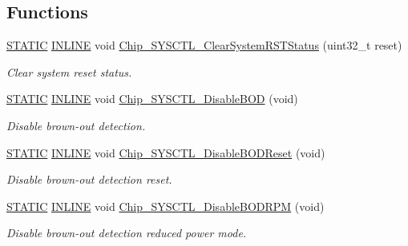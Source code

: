 \subsection*{Functions}
\begin{DoxyCompactItemize}
\item 
\hyperlink{group__LPC__Types__Public__Macros_ga10b2d890d871e1489bb02b7e70d9bdfb}{S\+T\+A\+T\+IC} \hyperlink{group__LPC__Types__Public__Types_ga2eb6f9e0395b47b8d5e3eeae4fe0c116}{I\+N\+L\+I\+NE} void \hyperlink{group__SYSCTL__17XX__40XX_ga565050aac84c3cfa86874d42630d7eb8}{Chip\+\_\+\+S\+Y\+S\+C\+T\+L\+\_\+\+Clear\+System\+R\+S\+T\+Status} (uint32\+\_\+t reset)
\begin{DoxyCompactList}\small\item\em Clear system reset status. \end{DoxyCompactList}\item 
\hyperlink{group__LPC__Types__Public__Macros_ga10b2d890d871e1489bb02b7e70d9bdfb}{S\+T\+A\+T\+IC} \hyperlink{group__LPC__Types__Public__Types_ga2eb6f9e0395b47b8d5e3eeae4fe0c116}{I\+N\+L\+I\+NE} void \hyperlink{group__SYSCTL__17XX__40XX_ga20468997a597d6fcae205472c22a949c}{Chip\+\_\+\+S\+Y\+S\+C\+T\+L\+\_\+\+Disable\+B\+OD} (void)
\begin{DoxyCompactList}\small\item\em Disable brown-\/out detection. \end{DoxyCompactList}\item 
\hyperlink{group__LPC__Types__Public__Macros_ga10b2d890d871e1489bb02b7e70d9bdfb}{S\+T\+A\+T\+IC} \hyperlink{group__LPC__Types__Public__Types_ga2eb6f9e0395b47b8d5e3eeae4fe0c116}{I\+N\+L\+I\+NE} void \hyperlink{group__SYSCTL__17XX__40XX_gaee6f6a45b42962728419d15328427564}{Chip\+\_\+\+S\+Y\+S\+C\+T\+L\+\_\+\+Disable\+B\+O\+D\+Reset} (void)
\begin{DoxyCompactList}\small\item\em Disable brown-\/out detection reset. \end{DoxyCompactList}\item 
\hyperlink{group__LPC__Types__Public__Macros_ga10b2d890d871e1489bb02b7e70d9bdfb}{S\+T\+A\+T\+IC} \hyperlink{group__LPC__Types__Public__Types_ga2eb6f9e0395b47b8d5e3eeae4fe0c116}{I\+N\+L\+I\+NE} void \hyperlink{group__SYSCTL__17XX__40XX_ga758135a9cf9c949acbee97291eb447bf}{Chip\+\_\+\+S\+Y\+S\+C\+T\+L\+\_\+\+Disable\+B\+O\+D\+R\+PM} (void)
\begin{DoxyCompactList}\small\item\em Disable brown-\/out detection reduced power mode. \end{DoxyCompactList}\item 

\end{DoxyCompactItemize}
